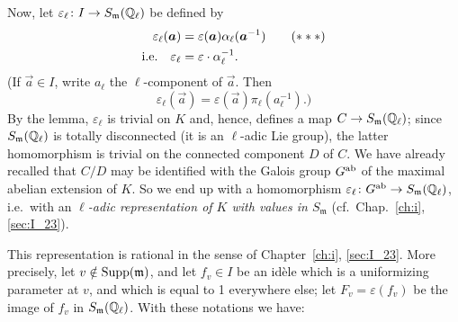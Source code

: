 Now, let $\varepsilon_\ell \colon I \to
S_{\mathfrak{m}}(\Q_\ell)$ be defined by
\dpage
\begin{align}
	\varepsilon_\ell(\vec a) &= \varepsilon(\vec a) \alpha_\ell(\vec a^{-1})
	\tag{$***$}\label{eqn:II_23_star} \\
	\text{i.e.} \quad \varepsilon_\ell &= \varepsilon \cdot \alpha_\ell^{-1}.
	\notag
\end{align}
(If $\vec a \in I$, write $a_\ell$ the $\ell$-component of $\vec a$. Then
\[
	\varepsilon_\ell(\vec a) = \varepsilon(\vec a) \pi_\ell(a_\ell^{-1}).)
\]
By the lemma, $\varepsilon_\ell$ is trivial on $K$ and, hence, defines a map
$C \to S_{\mathfrak{m}}(\Q_\ell)$; since $S_{\mathfrak{m}}(\Q_\ell)$ is
totally disconnected (it is an $\ell$-adic Lie group), the latter homomorphism is
trivial on the connected component $D$ of $C$. We have already recalled that $C/D$
may be identified with the Galois group $\abcl G$ of the maximal abelian
extension of $K$. So we end up with a homomorphism $\varepsilon_\ell \colon
\abcl G \to S_{\mathfrak{m}}(\Q_\ell)$, i.e.\ with an \emph{$\ell$-adic
representation of $K$ with values in $S_{\mathfrak{m}}$} (cf.\ 
Chap.~\ref{ch:i}, \ref{sec:I_23}).

This representation is rational in the sense of Chapter~\ref{ch:i},
\ref{sec:I_23}.  More precisely, let $v \notin \Supp(\mathfrak{m})$, and let
$f_v \in I$ be an idèle which is a uniformizing parameter at $v$, and which is
equal to 1 everywhere else; let $F_v = \varepsilon(f_v)$ be the image of $f_v$
in $S_{\mathfrak{m}}(\Q_\ell)$. With these notations we have:

